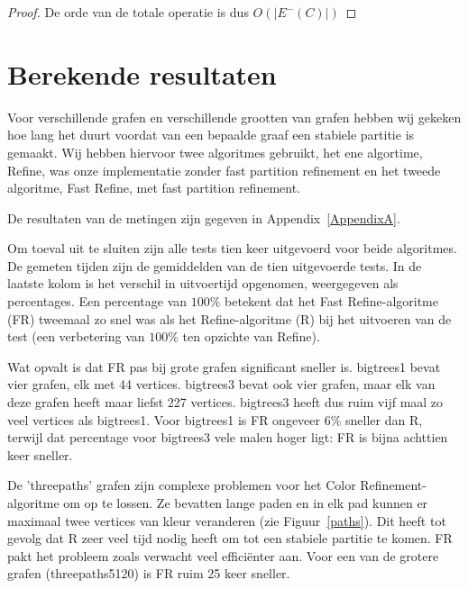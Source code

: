 \documentclass[twoside]{article}
\begin{document}
\begin{multicols}{2}
\begin{proof}
De orde van de totale operatie is dus $O(|E^{-}(C)|)$
\end{proof}


\section{Berekende resultaten}

Voor verschillende grafen en verschillende grootten van grafen hebben wij gekeken hoe lang het duurt voordat van een bepaalde graaf een stabiele partitie is gemaakt. Wij hebben hiervoor twee algoritmes gebruikt, het ene algortime, Refine, was onze implementatie zonder fast partition refinement en het tweede algoritme, Fast Refine, met fast partition refinement.

De resultaten van de metingen zijn gegeven in Appendix~\ref{AppendixA}.

Om toeval uit te sluiten zijn alle tests tien keer uitgevoerd voor beide algoritmes. De gemeten tijden zijn de gemiddelden van de tien uitgevoerde tests. In de laatste kolom is het verschil in uitvoertijd opgenomen, weergegeven als percentages. Een percentage van $100\%$ betekent dat het Fast Refine-algoritme (FR) tweemaal zo snel was als het Refine-algoritme (R) bij het uitvoeren van de test (een verbetering van $100$\% ten opzichte van Refine).

Wat opvalt is dat FR pas bij grote grafen significant sneller is. bigtrees1 bevat vier grafen, elk met 44 vertices. bigtrees3 bevat ook vier grafen, maar elk van deze grafen heeft maar liefst 227 vertices. bigtrees3 heeft dus ruim vijf maal zo veel vertices als bigtrees1. Voor bigtrees1 is FR ongeveer 6\% sneller dan R, terwijl dat percentage voor bigtrees3 vele malen hoger ligt: FR is bijna achttien keer sneller.

De 'threepaths' grafen zijn complexe problemen voor het Color Refinement-algoritme om op te lossen. Ze bevatten lange paden en in elk pad kunnen er maximaal twee vertices van kleur veranderen (zie Figuur~\ref{paths}). Dit heeft tot gevolg dat R zeer veel tijd nodig heeft om tot een stabiele partitie te komen. FR pakt het probleem zoals verwacht veel effici\"enter aan. Voor een van de grotere grafen (threepaths5120) is FR ruim 25 keer sneller.


\end{multicols}
\end{document}
